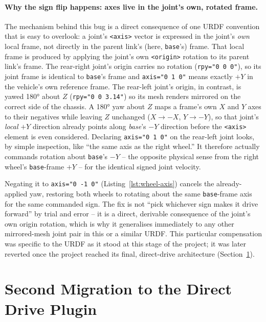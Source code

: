 \paragraph{Why the sign flip happens: axes live in the joint's own, rotated frame.}
The mechanism behind this bug is a direct consequence of one URDF
convention that is easy to overlook: a joint's \texttt{<axis>}
vector is expressed in the joint's \emph{own} local frame, not
directly in the parent link's (here, \texttt{base}'s) frame. That
local frame is produced by applying the joint's own \texttt{<origin>}
rotation to its parent link's frame. The rear-right joint's origin carries no
rotation (\texttt{rpy="0 0 0"}), so its joint frame is identical to
\texttt{base}'s frame and \texttt{axis="0 1 0"} means exactly
$+Y$ in the vehicle's own reference frame. The rear-left joint's
origin, in contrast, is yawed \ang{180} about $Z$
(\texttt{rpy="0 0 3.14"}) so its mesh renders mirrored on the correct
side of the chassis. A \ang{180} yaw about $Z$ maps a frame's own $X$
and $Y$ axes to their negatives while leaving $Z$ unchanged
($X \to -X$, $Y \to -Y$), so that joint's \emph{local} $+Y$ direction
already points along \emph{base}'s $-Y$ direction before the
\texttt{<axis>} element is even considered. Declaring
\texttt{axis="0 1 0"} on the rear-left joint looks, by simple
inspection, like ``the same axis as the right wheel.'' It therefore
actually commands rotation about \texttt{base}'s $-Y$ -- the
opposite physical sense from the right wheel's \texttt{base}-frame
$+Y$ -- for the identical signed joint velocity.

Negating it to \texttt{axis="0 -1 0"} (Listing~\ref{lst:wheel-axis})
cancels the already-applied yaw, restoring both wheels to rotating
about the same \texttt{base}-frame axis for the same commanded sign.
The fix is not ``pick whichever sign makes it drive forward'' by
trial and error -- it is a direct, derivable consequence of the
joint's own origin rotation, which is why it generalises immediately
to any other mirrored-mesh joint pair in this or a similar URDF. This
particular compensation was specific to the URDF as it stood at this
stage of the project; it was later reverted once the project reached
its final, direct-drive architecture (Section~\ref{sec:second-migration}).

\section{Second Migration to the Direct Drive Plugin}
\label{sec:second-migration}

